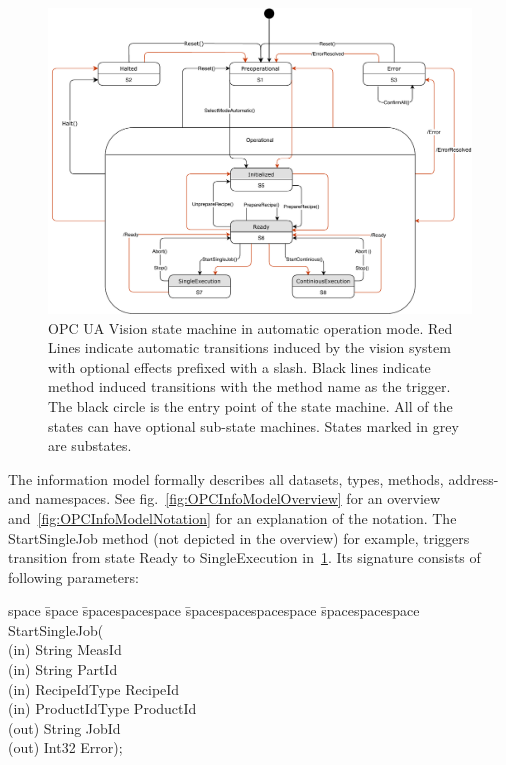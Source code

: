 \begin{figure}[ht]
    \centering
    \includegraphics[width=\textwidth]{img/OPCUAVisionVisionAutomaticModeStateMachineStates.pdf}
    \caption[OPC UA Vision state machine in automatic operation mode]{OPC UA Vision state machine in automatic operation mode. Red Lines indicate automatic transitions induced by the vision system with optional effects prefixed with a slash. Black lines indicate method induced transitions with the method name as the trigger. The black circle is the entry point of the state machine. All of the states can have optional sub-state machines. States marked in grey are substates.~\cite{VDMA2018OPCSpecification}}
    \label{fig:OPCStateMachineAutomatic}
\end{figure}

The information model formally describes all datasets, types, methods, address- and namespaces. See fig.~\ref{fig:OPCInfoModelOverview} for an overview and~\ref{fig:OPCInfoModelNotation} for an explanation of the notation. The StartSingleJob method (not depicted in the overview) for example, triggers transition from state Ready to SingleExecution in~\ref{fig:OPCStateMachineAutomatic}. Its signature consists of following parameters:

\begin{tabbing}
    space \= space \= spacespacespace \= spacespacespacespace \= spacespacespace \kill
    \>  StartSingleJob(\\
    \>  \>  (in)	 \> 	String          \> MeasId\\
    \>  \>  (in)	 \> 	String          \> PartId\\
    \>  \>  (in)	 \> 	RecipeIdType    \> RecipeId\\
    \>  \>  (in)	 \> 	ProductIdType   \> ProductId\\
    \>  \>  (out)	 \> 	String          \> JobId\\
    \>  \>  (out)	 \> 	Int32           \> Error); 
\end{tabbing}

